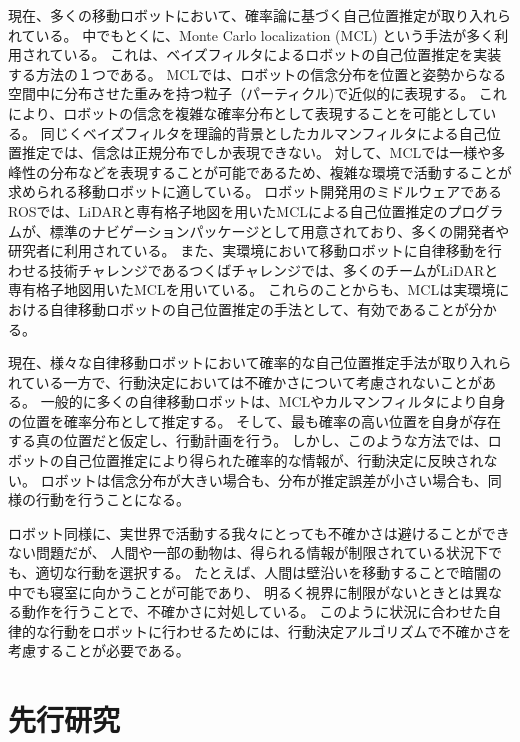 現在、多くの移動ロボットにおいて、確率論に基づく自己位置推定が取り入れられている。
中でもとくに、Monte Carlo localization (MCL) という手法が多く利用されている\cite{dellaert1999, fox1999}。
これは、ベイズフィルタによるロボットの自己位置推定を実装する方法の１つである。
MCLでは、ロボットの信念分布を位置と姿勢からなる空間中に分布させた重みを持つ粒子（パーティクル)で近似的に表現する。
これにより、ロボットの信念を複雑な確率分布として表現することを可能としている。
同じくベイズフィルタを理論的背景としたカルマンフィルタによる自己位置推定では、信念は正規分布でしか表現できない\cite{kalman1960}。
対して、MCLでは一様や多峰性の分布などを表現することが可能であるため、複雑な環境で活動することが求められる移動ロボットに適している。
ロボット開発用のミドルウェアであるROSでは、LiDARと専有格子地図を用いたMCLによる自己位置推定のプログラムが、標準のナビゲーションパッケージとして用意されており、多くの開発者や研究者に利用されている\cite{quigley2009ros,roswiki_amcl}。
また、実環境において移動ロボットに自律移動を行わせる技術チャレンジであるつくばチャレンジでは、多くのチームがLiDARと専有格子地図用いたMCLを用いている。
\cite{夏迫2016つくばチャレンジ}
これらのことからも、MCLは実環境における自律移動ロボットの自己位置推定の手法として、有効であることが分かる。

現在、様々な自律移動ロボットにおいて確率的な自己位置推定手法が取り入れられている一方で、行動決定においては不確かさについて考慮されないことがある。
一般的に多くの自律移動ロボットは、MCLやカルマンフィルタにより自身の位置を確率分布として推定する。
そして、最も確率の高い位置を自身が存在する真の位置だと仮定し、行動計画を行う。
しかし、このような方法では、ロボットの自己位置推定により得られた確率的な情報が、行動決定に反映されない。
ロボットは信念分布が大きい場合も、分布が推定誤差が小さい場合も、同様の行動を行うことになる。

ロボット同様に、実世界で活動する我々にとっても不確かさは避けることができない問題だが、
人間や一部の動物は、得られる情報が制限されている状況下でも、適切な行動を選択する。
たとえば、人間は壁沿いを移動することで暗闇の中でも寝室に向かうことが可能であり、
明るく視界に制限がないときとは異なる動作を行うことで、不確かさに対処している。
このように状況に合わせた自律的な行動をロボットに行わせるためには、行動決定アルゴリズムで不確かさを考慮することが必要である。


\section{先行研究} \label{section:related works}

